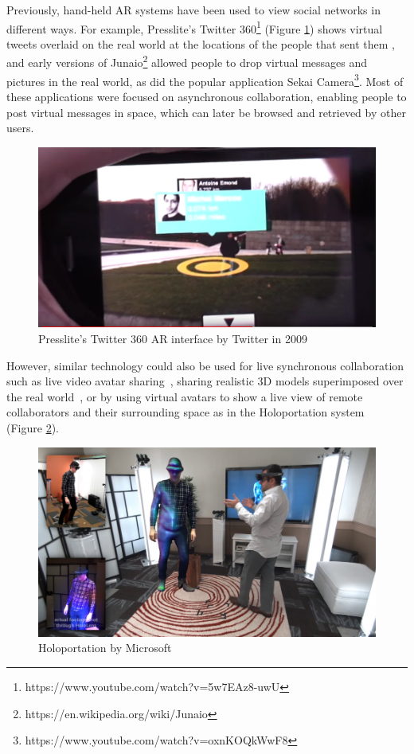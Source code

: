 Previously, hand-held AR systems have been used to view social networks in different ways. For example, Presslite's Twitter 360\footnote{https://www.youtube.com/watch?v=5w7EAz8-uwU} (Figure \ref{fig:presslite}) shows virtual tweets overlaid on the real world at the locations of the people that sent them , and early versions of Junaio\footnote{https://en.wikipedia.org/wiki/Junaio} allowed people to drop virtual messages and pictures in the real world, as did the popular application Sekai Camera\footnote{https://www.youtube.com/watch?v=oxnKOQkWwF8}. Most of these applications were focused on asynchronous collaboration, enabling people to post virtual messages in space, which can later be browsed and retrieved by other users. 

\begin{figure}
    \centering
    \includegraphics[width=.8\linewidth]{images/Presslite-twitter-360.PNG}
    \caption{Presslite's Twitter 360 AR interface by Twitter in 2009}
    \label{fig:presslite}
\end{figure}

However, similar technology could also be used for live synchronous collaboration such as live video avatar sharing~\cite{Billinghurst2002}, sharing realistic 3D models superimposed over the real world~\cite{Fanello2016}, or by using virtual avatars to show a live view of remote collaborators and their surrounding space as in the Holoportation system~\cite{Fanello2016} (Figure \ref{fig:holoportation}).

\begin{figure}
    \centering
    \includegraphics[width=.8\linewidth]{images/holoportation.png}
    \caption{Holoportation by Microsoft \cite{Fanello2016}}
    \label{fig:holoportation}
\end{figure}

